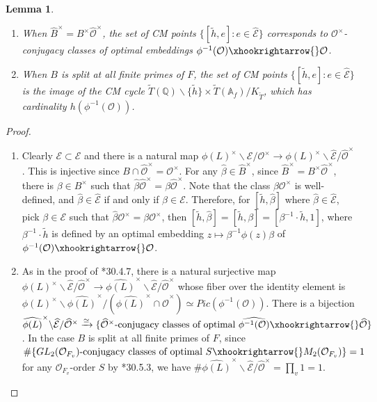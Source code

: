\documentclass{amsart}
\numberwithin{equation}{subsection}
\numberwithin{theorem}{section}
\newtheorem{lemma}[theorem]{Lemma}
\theoremstyle{definition}
\theoremstyle{remark}
\newcommand{\bA}{\mathbb{A}}
\newcommand{\bQ}{\mathbb{Q}}
\newcommand{\cE}{\mathcal{E}}
\newcommand{\cO}{\mathcal{O}}
\begin{document}
\begin{lemma} \label{lem:optemb}
    \begin{enumerate}
        \item When $\widehat{B}^\times = B^\times \widehat{\mathcal{O}}^\times$, the set of CM points $\{[\tilde{h}, e]: e\in \widehat{\mathcal{E}}\}$ corresponds to $\cO^\times$-conjugacy classes of optimal embeddings $\phi^{-1}(\mathcal{O})\xhookrightarrow{}\mathcal{O}$.  
        \item When $B$ is split at all finite primes of $F$, the set of CM points $\{[\tilde{h}, e]: e\in \widehat{\mathcal{E}}\}$ is the image of the CM cycle $\widetilde{T}(\bQ) \backslash \{\tilde{h}\} \times\widetilde{T}(\bA_f) / K_{\widetilde{T}}$, which has cardinality $h(\phi^{-1}(\mathcal{O}))$.
    \end{enumerate}
\end{lemma}
\begin{proof}
    \begin{enumerate}
        \item Clearly $\cE \subset \widehat{\cE}$ and there is a natural map $\phi(L)^\times \backslash\cE/\mathcal{O}^\times \to \phi(L)^\times \backslash \widehat{\cE} /\widehat{\cO}^\times$. This is injective since $B\cap \widehat{\cO}^\times = \cO^\times$. For any $\widehat{\beta}\in \widehat{B}^\times$, since $\widehat{B}^\times = B^\times \widehat{\mathcal{O}}^\times$, there is $\beta\in B^\times$ such that $\widehat{\beta}\widehat{\cO}^\times = \beta\widehat{\cO}^\times$. Note that the class $\beta\cO^\times$ is well-defined, and $\widehat{\beta}\in \widehat{\cE}$ if and only if $\beta\in \cE$. Therefore, for $[\tilde{h}, \widehat{\beta}]$ where $\widehat{\beta}\in \widehat{\cE}$, pick $\beta \in \cE$ such that $\widehat{\beta}\mathcal{O}^\times = \beta\cO^\times$, then $[\tilde{h}, \widehat{\beta}] = [\tilde{h}, \beta] = [\beta^{-1}\cdot \tilde{h}, 1]$, where $\beta^{-1}\cdot \tilde{h}$ is defined by an optimal embedding $z\mapsto \beta^{-1}\phi(z) \beta$ of $\phi^{-1}(\cO)\xhookrightarrow{}\cO$. 
        \item As in the proof of \cite{MR4279905}*{30.4.7}, there is a natural surjective map $\phi(L)^\times \backslash \widehat{\mathcal{E}}/\widehat{\mathcal{O}}^\times\to \widehat{\phi(L)}^\times\backslash \widehat{\mathcal{E}}/\widehat{\mathcal{O}}^\times$ whose fiber over the identity element is $\phi(L)^\times \backslash \widehat{\phi(L)}^\times/(\widehat{\phi(L)}^\times\cap\widehat{\mathcal{O}}^\times)\simeq Pic (\phi^{-1}(\mathcal{O}))$. 
        There is a bijection $\widehat{\phi(L)}^\times\backslash \widehat{\mathcal{E}}/\widehat{\mathcal{O}}^\times \xrightarrow{\simeq} \{\widehat{\mathcal{O}}^\times\text{-conjugacy classes of optimal }\widehat{\phi^{-1}(\mathcal{O})}\xhookrightarrow{} \widehat{\mathcal{O}}\}$. In the case $B$ is split at all finite primes of $F$, since $\#\{GL_2(\mathcal{O}_{F_v})\text{-conjugacy classes of optimal }S\xhookrightarrow{} M_2(\mathcal{O}_{F_v})\} = 1$ for any $\mathcal{O}_{F_v}$-order $S$ by  \cite{MR4279905}*{30.5.3}, we have $\# \widehat{\phi(L)}^\times\backslash \widehat{\mathcal{E}}/\widehat{\mathcal{O}}^\times = \prod_v 1 = 1$.
    \end{enumerate}
\end{proof}
\end{document}
